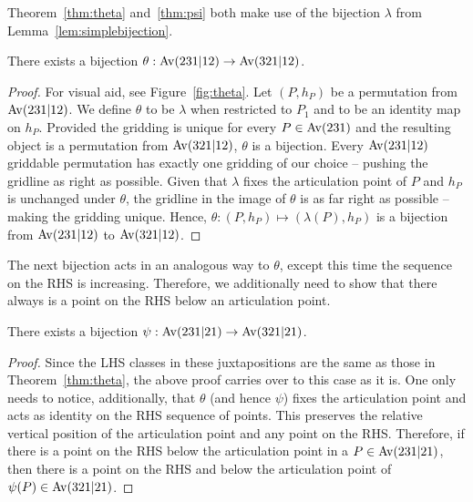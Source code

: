 Theorem~\ref{thm:theta} and~\ref{thm:psi} both make use of the bijection $\lambda$ from Lemma~\ref{lem:simplebijection}. 
\begin{theorem}
\label{thm:theta}
There exists a bijection $\theta: \mathrm{Av}(231|12) \rightarrow \mathrm{Av}(321|12)$. 
\end{theorem}
\begin{proof}
For visual aid, see Figure~\ref{fig:theta}. Let $(P,h_P)$ be a permutation from $\mathrm{Av}(231|12)$. We define $\theta$ to be $\lambda$ when restricted to $P_1$ and to be an identity map on $h_P$. Provided the gridding is unique for every $P \in \mathrm{Av}(231)$ and the resulting object is a permutation from $\mathrm{Av}(321|12)$, $\theta$ is a bijection. Every $\mathrm{Av}(231|12)$ griddable permutation has exactly one gridding of our choice -- pushing the gridline as right as possible. Given that $\lambda$ fixes the articulation point of $P$ and $h_P$ is unchanged under $\theta$, the gridline in the image of $\theta$ is as far right as possible -- making the gridding unique. Hence, $\theta: (P,h_P) \mapsto (\lambda(P),h_P)$ is a bijection from $\mathrm{Av}(231|12)$ to $\mathrm{Av}(321|12)$. 
\end{proof}

The next bijection acts in an analogous way to $\theta$, except this time the sequence on the RHS is increasing. Therefore, we additionally need to show that there always is a point on the RHS below an articulation point.

\begin{theorem}
\label{thm:psi}
There exists a bijection $\psi: \mathrm{Av}(231|21) \rightarrow \mathrm{Av}(321|21)$. 
\end{theorem}
\begin{proof}
Since the LHS classes in these juxtapositions are the same as those in Theorem~\ref{thm:theta}, the above proof carries over to this case as it is. One only needs to notice, additionally, that $\theta$ (and hence $\psi$) fixes the articulation point and acts as identity on the RHS sequence of points. This preserves the relative vertical position of the articulation point and any point on the RHS. Therefore, if there is a point on the RHS below the articulation point in a $P \in \mathrm{Av}(231|21)$, then there is a point on the RHS and below the articulation point of $\psi(P) \in \mathrm{Av}(321|21)$. 
\end{proof}

